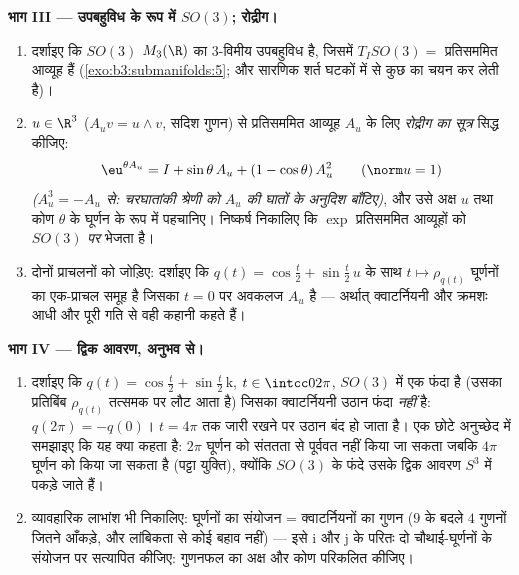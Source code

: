 \begin{problem}
\medskip
\noindent\textbf{भाग III --- उपबहुविध के रूप में $SO(3)$;
रोद्रीग।}
\begin{enumerate}[resume]
  \item दर्शाइए कि $SO(3)$ $M_3(\R)$ का  $3$-विमीय उपबहुविध है,
        जिसमें $T_ISO(3) =$ प्रतिसममित आव्यूह हैं (\cref{exo:b3:submanifolds:5}; और सारणिक शर्त
        घटकों में से कुछ का चयन कर लेती है)।
  \item $u \in \R^3$ ($A_uv = u\wedge v$, सदिश गुणन) से  प्रतिसममित आव्यूह
        $A_u$ के लिए \emph{रोद्रीग का सूत्र} सिद्ध कीजिए:
        \[
        \eu^{\theta A_u} = I + \sin\theta\,A_u + (1 -
        \cos\theta)\,A_u^2 \qquad (\norm u = 1)
        \]
        \emph{($A_u^3 = -A_u$ से: चरघातांकी श्रेणी को $A_u$ की घातों के
        अनुदिश बाँटिए)}, और उसे अक्ष $u$ तथा कोण $\theta$ के घूर्णन
        के रूप में पहचानिए। निष्कर्ष निकालिए कि $\exp$ प्रतिसममित
        आव्यूहों को $SO(3)$ \emph{पर} भेजता है।
  \item दोनों प्राचलनों को जोड़िए: दर्शाइए कि $q(t) = \cos\frac t2 +
        \sin\frac t2\,u$ के साथ $t
        \mapsto \rho_{q(t)}$
        घूर्णनों का एक-प्राचल समूह है जिसका $t = 0$ पर अवकलज $A_u$
        है --- अर्थात् क्वाटर्नियनी और  क्रमशः
        आधी और पूरी गति से वही कहानी कहते हैं।
\end{enumerate}

\medskip
\noindent\textbf{भाग IV --- द्विक आवरण, अनुभव से।}
\begin{enumerate}[resume]
  \item दर्शाइए कि  $q(t) = \cos\frac t2 + \sin\frac
        t2\,\mathrm k$, $t \in \intcc0{2\pi}$, $SO(3)$ में एक फंदा है (उसका
        प्रतिबिंब $\rho_{q(t)}$ तत्समक पर लौट आता है) जिसका क्वाटर्नियनी
        उठान फंदा \emph{नहीं} है: $q(2\pi) = -q(0)$। $t = 4\pi$ तक जारी रखने पर
        उठान बंद हो जाता है। एक छोटे अनुच्छेद में समझाइए कि यह
        क्या कहता है: $2\pi$ घूर्णन को संततता से पूर्ववत नहीं किया
        जा सकता जबकि $4\pi$ घूर्णन को किया जा सकता है (पट्टा
        युक्ति), क्योंकि $SO(3)$ के फंदे उसके द्विक आवरण $S^3$ में
        पकड़े जाते हैं।
  \item व्यावहारिक लाभांश भी निकालिए: घूर्णनों का संयोजन =
        क्वाटर्नियनों का गुणन ($9$ के बदले $4$ गुणनों जितने
        आँकड़े, और लांबिकता से कोई बहाव नहीं) --- इसे $\mathrm i$ और
        $\mathrm j$ के परितः दो चौथाई-घूर्णनों के संयोजन पर सत्यापित
        कीजिए: गुणनफल का अक्ष और कोण परिकलित कीजिए।
\end{enumerate}


\end{problem}
